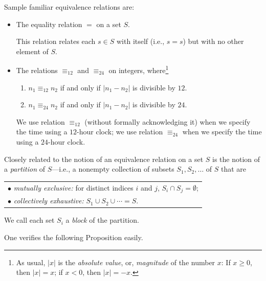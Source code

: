 \noindent
Sample familiar  equivalence relations are:
\begin{itemize}
\item
The equality relation $=$ on a set $S$.

\smallskip

This relation relates each $s \in S$ with itself (i.e., $s=s$) but with no other element of $S$.

\medskip\item
The relations $\equiv_{12}$ and $\equiv_{24}$ on integers, where\footnote{As usual, $|x|$ is the {\em absolute value}, or, {\em magnitude} of the number $x$: If $x \geq 0$, then $|x| = x$; if $x < 0$, then $|x| = -x$.}
  \begin{enumerate}
  \item
$n_1 \equiv_{12} n_2$ if and only if $|n_1 - n_2|$ is divisible by $12$.
  \medskip\item
$n_1 \equiv_{24} n_2$ if and only if $|n_1 - n_2|$ is divisible by $24$.
  \end{enumerate}

\smallskip

We use relation $\equiv_{12}$ (without formally acknowledging it) when we specify the time using a $12$-hour clock; we use relation $\equiv_{24}$ when we specify the time using a $24$-hour clock.
\end{itemize}

\smallskip

 

\noindent
Closely related to the notion of an equivalence relation on a set $S$ is the notion of a {\it partition} of $S$---i.e., a nonempty collection of subsets $S_1, S_2, \ldots$ of $S$ that are

\smallskip

\begin{tabular}{l}
$\bullet$ {\em mutually exclusive:}
for distinct indices $i$ and $j$, $S_i \cap S_j = \emptyset$; \\
$\bullet$ {\em collectively exhaustive:}
$S_1 \cup S_2 \cup \cdots = S$.
\end{tabular}

\smallskip

\noindent
We call each set $S_i$ a {\it block} of the partition. 
 

\noindent
One verifies the following Proposition easily.

